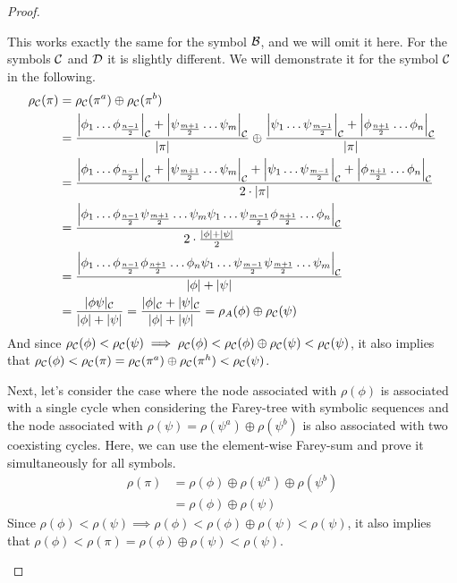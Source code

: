 \begin{proof}
\begin{itemize}
			This works exactly the same for the symbol $\mathcal{B}$, and we will omit it here.
			For the symbols $\mathcal{C}$ and $\mathcal{D}$ it is slightly different.
			We will demonstrate it for the symbol $\mathcal{C}$ in the following.
			\begin{align*}
				\rho_{\mathcal{C}}(\pi) & = \rho_{\mathcal{C}}(\pi^a) \oplus \rho_{\mathcal{C}}(\pi^b)                                                                       \\
				             & =
				\dfrac{\left|\phi_1 \dots \phi_{\frac{n-1}{2}}\right|_{\mathcal{C}} + \left|\psi_{\frac{m+1}{2}} \dots \psi_m\right|_{\mathcal{C}}}{|\pi|}
				\oplus \dfrac{\left|\psi_1 \dots \psi_{\frac{m-1}{2}}\right|_{\mathcal{C}} + \left|\phi_{\frac{n+1}{2}} \dots \phi_n\right|_{\mathcal{C}}}{|\pi|} \\
				             & =
				\dfrac
				{\left|\phi_1 \dots \phi_{\frac{n-1}{2}}\right|_{\mathcal{C}} + \left|\psi_{\frac{m+1}{2}} \dots \psi_m\right|_{\mathcal{C}} + \left|\psi_1 \dots \psi_{\frac{m-1}{2}}\right|_{\mathcal{C}} + \left|\phi_{\frac{n+1}{2}} \dots \phi_n\right|_{\mathcal{C}}}
				{2 \cdot |\pi|}                                                                                                             \\
				             & =
				\dfrac
				{\left|\phi_1 \dots \phi_{\frac{n-1}{2}} \psi_{\frac{m+1}{2}} \dots \psi_m \psi_1 \dots \psi_{\frac{m-1}{2}} \phi_{\frac{n+1}{2}} \dots \phi_n\right|_{\mathcal{C}}}
				{2 \cdot \frac{|\phi| + |\psi|}{2}}                                                                                         \\
				             & =
				\dfrac
				{\left|\phi_1 \dots \phi_{\frac{n-1}{2}} \phi_{\frac{n+1}{2}} \dots \phi_n \psi_1 \dots \psi_{\frac{m-1}{2}} \psi_{\frac{m+1}{2}} \dots \psi_m\right|_{\mathcal{C}}}
				{|\phi| + |\psi|}                                                                                                           \\
				             &
				= \dfrac{|\phi\psi|_{\mathcal{C}}}{|\phi| + |\psi|}
				= \dfrac{|\phi|_{\mathcal{C}} + |\psi|_{\mathcal{C}}}{|\phi| + |\psi|}
				= \rho_A(\phi) \oplus \rho_{\mathcal{C}}(\psi)
			\end{align*}
			And since $\rho_{\mathcal{C}}(\phi) < \rho_{\mathcal{C}}(\psi) \implies \rho_{\mathcal{C}}(\phi) < \rho_{\mathcal{C}}(\phi) \oplus \rho_{\mathcal{C}}(\psi) < \rho_{\mathcal{C}}(\psi)$,
			it also implies that $\rho_{\mathcal{C}}(\phi) < \rho_{\mathcal{C}}(\pi) =  \rho_{\mathcal{C}}(\pi^a) \oplus \rho_{\mathcal{C}}(\pi^h) < \rho_{\mathcal{C}}(\psi)$.

			Next, let's consider the case where the node associated with $\rho(\phi)$ is associated with a single cycle when considering the Farey-tree with symbolic sequences and the node associated with $\rho(\psi) = \rho(\psi^a) \oplus \rho(\psi^b)$ is also associated with two coexisting cycles.
			Here, we can use the element-wise Farey-sum and prove it simultaneously for all symbols.
			\begin{align*}
				\rho(\pi) & = \rho(\phi) \oplus \rho(\psi^a) \oplus \rho(\psi^b) \\
				          & = \rho(\phi) \oplus \rho(\psi)
			\end{align*}
			Since $\rho(\phi) < \rho(\psi) \implies \rho(\phi) < \rho(\phi) \oplus \rho(\psi) < \rho(\psi)$, it also implies that $\rho(\phi) < \rho(\pi) = \rho(\phi) \oplus \rho(\psi) < \rho(\psi)$.


\end{itemize}
\end{proof}
